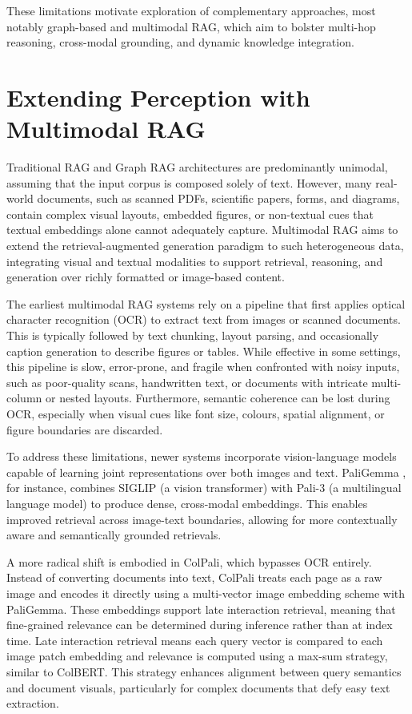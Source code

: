 \documentclass[12pt,twoside]{report}
\begin{document}
These limitations motivate exploration of complementary approaches, most notably graph-based and multimodal RAG, which aim to bolster multi-hop reasoning, cross-modal grounding, and dynamic knowledge integration.

\section{Extending Perception with Multimodal RAG}

Traditional RAG and Graph RAG architectures are predominantly unimodal, assuming that the input corpus is composed solely of text. However, many real-world documents, such as scanned PDFs, scientific papers, forms, and diagrams, contain complex visual layouts, embedded figures, or non-textual cues that textual embeddings alone cannot adequately capture. Multimodal RAG aims to extend the retrieval-augmented generation paradigm to such heterogeneous data, integrating visual and textual modalities to support retrieval, reasoning, and generation over richly formatted or image-based content.

The earliest multimodal RAG systems rely on a pipeline that first applies optical character recognition (OCR) to extract text from images or scanned documents. This is typically followed by text chunking, layout parsing, and occasionally caption generation to describe figures or tables. While effective in some settings, this pipeline is slow, error-prone, and fragile when confronted with noisy inputs, such as poor-quality scans, handwritten text, or documents with intricate multi-column or nested layouts. Furthermore, semantic coherence can be lost during OCR, especially when visual cues like font size, colours, spatial alignment, or figure boundaries are discarded.

To address these limitations, newer systems incorporate vision-language models capable of learning joint representations over both images and text. PaliGemma \cite{PaliGemma}, for instance, combines SIGLIP\cite{SIGLIP} (a vision transformer) with Pali-3\cite{Pali3} (a multilingual language model) to produce dense, cross-modal embeddings. This enables improved retrieval across image-text boundaries, allowing for more contextually aware and semantically grounded retrievals.

A more radical shift is embodied in ColPali\cite{ColPali}, which bypasses OCR entirely. Instead of converting documents into text, ColPali treats each page as a raw image and encodes it directly using a multi-vector image embedding scheme with PaliGemma. These embeddings support late interaction retrieval, meaning that fine-grained relevance can be determined during inference rather than at index time. Late interaction retrieval means each query vector is compared to each image patch embedding and relevance is computed using a max-sum strategy, similar to ColBERT. This strategy enhances alignment between query semantics and document visuals, particularly for complex documents that defy easy text extraction.
\end{document}
